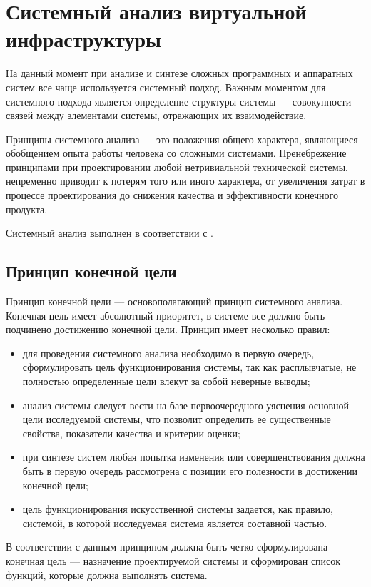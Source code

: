 \section{Системный анализ виртуальной инфраструктуры}

На данный момент при анализе и синтезе сложных программных и аппаратных систем все чаще используется системный подход.
Важным моментом для системного подхода является определение структуры системы --- совокупности связей между элементами системы, отражающих их взаимодействие.

Принципы системного анализа --- это положения общего характера, являющиеся обобщением опыта работы человека со сложными системами.
Пренебрежение принципами при проектировании любой нетривиальной технической системы, непременно приводит к потерям того или иного характера, от увеличения затрат в процессе проектирования до снижения качества и эффективности конечного продукта.

Системный анализ выполнен в соответствии с \cite{sys-analyz}.

\subsection{Принцип конечной цели} \label{goal}

Принцип конечной цели --- основополагающий принцип системного анализа.
Конечная цель имеет абсолютный приоритет, в системе все должно быть подчинено достижению конечной цели.
Принцип имеет несколько правил:
\begin{itemize}
  \item для проведения системного анализа необходимо в первую очередь, сформулировать цель функционирования системы, так как расплывчатые, не полностью определенные цели влекут за собой неверные выводы;
  \item анализ системы следует вести на базе первоочередного уяснения основной цели исследуемой системы, что позволит определить ее существенные свойства, показатели качества и критерии оценки;
  \item при синтезе систем любая попытка изменения или совершенствования должна быть в первую очередь рассмотрена с позиции его полезности в достижении конечной цели;
  \item цель функционирования искусственной системы задается, как правило, системой, в которой исследуемая система является составной частью.
\end{itemize}

В соответствии с данным принципом должна быть четко сформулирована конечная цель --- назначение проектируемой системы и сформирован список функций, которые должна выполнять система.

